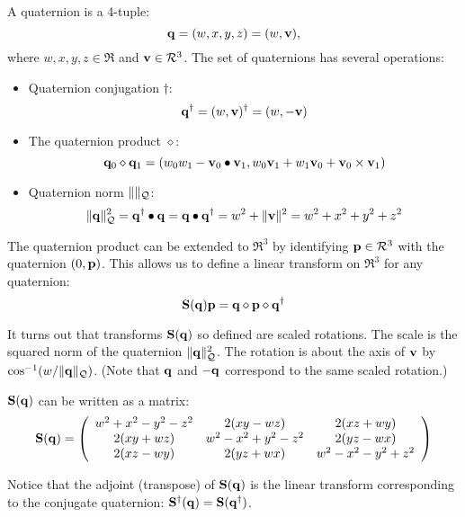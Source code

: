 A quaternion is a 4-tuple:
\begin{equation}
{\mathbf q} = (w, x, y, z) = (w, {\mathbf v}),
\end{equation}
where $w, x, y, z \in \Re$ and ${\mathbf v} \in \mathcal{R}^3$.
The set of quaternions has several operations:
\begin{itemize}
\item Quaternion conjugation $\dagger$:
\begin{equation}
{\mathbf q}^\dagger = (w, {\mathbf v})^\dagger = (w, - {\mathbf v})
\end{equation}
\item The quaternion product $\diamond$:
\begin{equation}
{\mathbf q}_0 \diamond {\mathbf q}_1 = (w_0w_1 - {\mathbf v}_0 \bullet {\mathbf v}_1, w_0 {\mathbf v}_1 + w_1 {\mathbf v}_0 + {\mathbf v}_0 \times {\mathbf v}_1)
\end{equation}
\item Quaternion norm $\| \|_{\mathcal{Q}}$:
\begin{equation}
\| {\mathbf q} \|_{\mathcal{Q}}^2
= {\mathbf q}^\dagger \bullet {\mathbf q}
= {\mathbf q} \bullet {\mathbf q}^\dagger
= w^2 + \|{\mathbf v}\|^2
= w^2 + x^2 + y^2 + z^2
\end{equation}
\end{itemize}

The quaternion product can be extended to $\Re^3$
by identifying ${\mathbf p} \in \mathcal{R}^3$ with
the quaternion $(0,{\mathbf p})$.
This allows us to define a linear transform
on $\Re^3$ for any quaternion:
\begin{equation}
{\mathbf S}({\mathbf q}) {\mathbf p} = {\mathbf q} \diamond {\mathbf p} \diamond {\mathbf q}^\dagger
\end{equation}

It turns out that transforms ${\mathbf S}({\mathbf q})$ so defined are scaled rotations.
The scale is the squared norm of the quaternion $\| {\mathbf q} \|_{\mathcal{Q}}^2$.
The rotation is about the axis of ${\mathbf v}$
by $\cos^{-1}(w / \| {\mathbf q} \|_{\mathcal{Q}})$.
(Note that ${\mathbf q}$ and $-{\mathbf q}$ correspond to the same scaled rotation.)

${\mathbf S}({\mathbf q})$ can be written as a matrix:
\begin{equation}
\label{eq:quaternion-matrix}
{\mathbf S}({\mathbf q}) =
\left(
\begin{array}{ccc}
w^2 + x^2 - y^2 - z^2 & 2(xy - wz)            & 2(xz + wy)           \\
2(xy + wz)            & w^2 - x^2 + y^2 - z^2 & 2(yz - wx)           \\
2(xz - wy)            & 2(yz + wx)            & w^2 - x^2 - y^2 +z^2
\end{array}
\right)
\end{equation}

Notice that the adjoint (transpose) of ${\mathbf S}({\mathbf q})$
is the linear transform corresponding to the conjugate quaternion:
${\mathbf S}^{\dagger}({\mathbf q}) =  {\mathbf S}({\mathbf q}^{\dagger})$.

